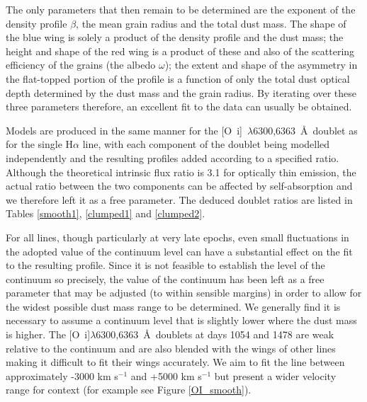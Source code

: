 \documentclass[useAMS,usenatbib,usegraphicx]{mnras}
\begin{document}
The only parameters that then remain to be determined are the exponent of 
the density profile $\beta$, the mean grain  radius and the total dust mass.  The shape 
of the blue wing is solely a product of the density profile and the dust 
mass; the height and shape of the red wing is a product of these and also 
of the scattering efficiency of the grains (the albedo $\omega$); the 
extent and shape of the asymmetry in the flat-topped portion of the 
profile is a function of only the total dust optical depth determined by the 
dust mass and the grain radius.  By iterating over these three parameters 
therefore, an excellent fit to the data can usually be obtained.

Models are produced in the same manner for the 
[O~{\sc i}]~$\lambda$6300,6363~\AA\ doublet as for the single H$\alpha$ line, with each component 
of the doublet being modelled independently and the resulting profiles 
added according to a specified ratio.  Although the theoretical intrinsic flux ratio 
is 3.1 for optically thin emission, the actual ratio between the two components can be 
affected by self-absorption \citep{Li1992} and we therefore 
left it as a free parameter.  The deduced doublet ratios are listed in Tables \ref{smooth1}, \ref{clumped1} and \ref{clumped2}.  

For all lines, though particularly at very late epochs, even small fluctuations in the adopted value of the 
continuum level can have a substantial effect on the fit to the resulting 
profile.  Since it is not feasible to establish the level of the continuum 
so precisely, the value of the continuum has been left as a free parameter 
that may be adjusted (to within sensible margins) in order to allow for 
the widest possible dust mass range to be determined.  We generally find 
it is necessary to assume a continuum level that is slightly lower where 
the dust mass is higher.  The [O~{\sc i}]$\lambda$6300,6363~\AA\ doublets at days 1054 and 1478 are weak relative to the continuum and are also blended with the wings of other lines making it difficult to fit their wings accurately.  We aim to fit the line between approximately -3000 km s$^{-1}$ and +5000 km s$^{-1}$ but present a wider velocity range for context (for example see Figure \ref{OI_smooth}).
\end{document}

